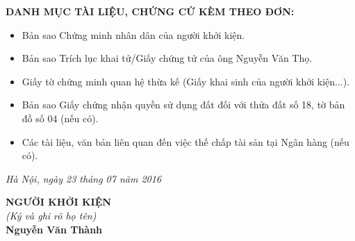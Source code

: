 \documentclass[12pt,a4paper]{article}
\begin{document}
\vspace{0.3cm}\noindent\textbf{\large DANH MỤC TÀI LIỆU, CHỨNG CỨ KÈM THEO ĐƠN:}\\[0.15cm]

\begin{itemize}[leftmargin=*, itemsep=2pt, topsep=2pt, parsep=0pt]
  \item Bản sao Chứng minh nhân dân của người khởi kiện.
  \item Bản sao Trích lục khai tử/Giấy chứng tử của ông Nguyễn Văn Thọ.
  \item Giấy tờ chứng minh quan hệ thừa kế (Giấy khai sinh của người khởi kiện...).
  \item Bản sao Giấy chứng nhận quyền sử dụng đất đối với thửa đất số 18, tờ bản đồ số 04 (nếu có).
  \item Các tài liệu, văn bản liên quan đến việc thế chấp tài sản tại Ngân hàng (nếu có).


\end{itemize}
\textit{Hà Nội, ngày 23 tháng 07 năm 2016}

\vspace{0.8cm}
\noindent
\hfill
\begin{minipage}[t]{0.50\textwidth}
    \begin{center}
        \textbf{NGƯỜI KHỞI KIỆN}\\[0.1cm]
        \textit{(Ký và ghi rõ họ tên)}\\[1.6cm]
        \textbf{Nguyễn Văn Thành}
    \end{center}
\end{minipage}
\end{document}
